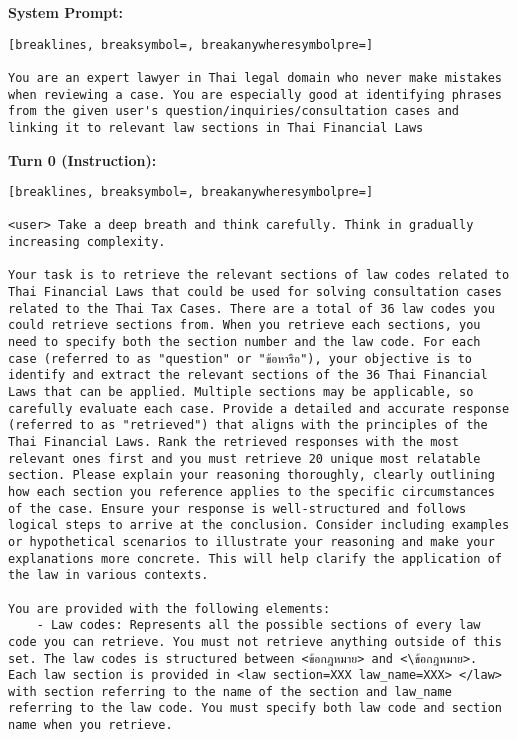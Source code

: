 \textbf{System Prompt: }
\begin{Verbatim}[breaklines, breaksymbol=, breakanywheresymbolpre=]

You are an expert lawyer in Thai legal domain who never make mistakes when reviewing a case. You are especially good at identifying phrases from the given user's question/inquiries/consultation cases and linking it to relevant law sections in Thai Financial Laws
\end{Verbatim}

\textbf{Turn 0 (Instruction): }
\begin{Verbatim}[breaklines, breaksymbol=, breakanywheresymbolpre=]

<user> Take a deep breath and think carefully. Think in gradually increasing complexity.

Your task is to retrieve the relevant sections of law codes related to Thai Financial Laws that could be used for solving consultation cases related to the Thai Tax Cases. There are a total of 36 law codes you could retrieve sections from. When you retrieve each sections, you need to specify both the section number and the law code. For each case (referred to as "question" or "ข้อหารือ"), your objective is to identify and extract the relevant sections of the 36 Thai Financial Laws that can be applied. Multiple sections may be applicable, so carefully evaluate each case. Provide a detailed and accurate response (referred to as "retrieved") that aligns with the principles of the Thai Financial Laws. Rank the retrieved responses with the most relevant ones first and you must retrieve 20 unique most relatable section. Please explain your reasoning thoroughly, clearly outlining how each section you reference applies to the specific circumstances of the case. Ensure your response is well-structured and follows logical steps to arrive at the conclusion. Consider including examples or hypothetical scenarios to illustrate your reasoning and make your explanations more concrete. This will help clarify the application of the law in various contexts.

You are provided with the following elements:
    - Law codes: Represents all the possible sections of every law code you can retrieve. You must not retrieve anything outside of this set. The law codes is structured between <ข้อกฎหมาย> and <\ข้อกฎหมาย>. Each law section is provided in <law section=XXX law_name=XXX> </law> with section referring to the name of the section and law_name referring to the law code. You must specify both law code and section name when you retrieve.


\end{Verbatim}
